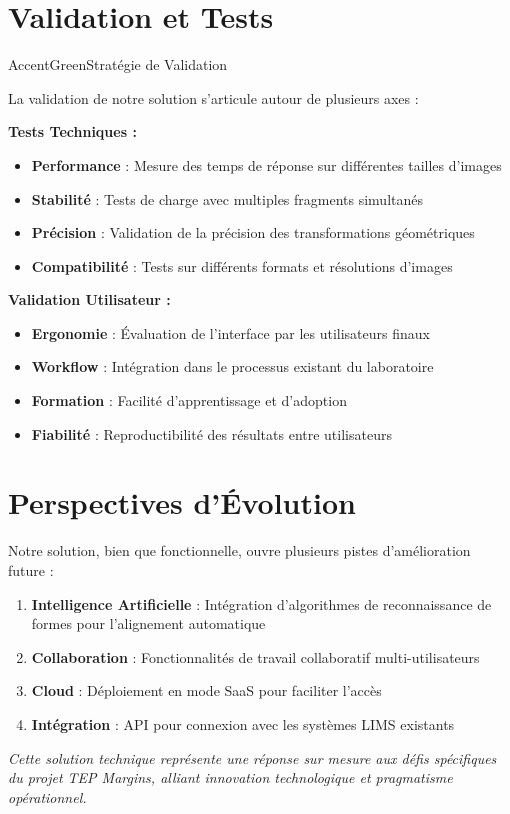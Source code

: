 \documentclass[11pt,a4paper]{article}
\begin{document}
\section{Validation et Tests}

\begin{subsectionbox}{AccentGreen}{Stratégie de Validation}

La validation de notre solution s'articule autour de plusieurs axes :

\textbf{Tests Techniques :}
\begin{itemize}[leftmargin=*]
    \item \textbf{Performance} : Mesure des temps de réponse sur différentes tailles d'images
    \item \textbf{Stabilité} : Tests de charge avec multiples fragments simultanés
    \item \textbf{Précision} : Validation de la précision des transformations géométriques
    \item \textbf{Compatibilité} : Tests sur différents formats et résolutions d'images
\end{itemize}

\textbf{Validation Utilisateur :}
\begin{itemize}[leftmargin=*]
    \item \textbf{Ergonomie} : Évaluation de l'interface par les utilisateurs finaux
    \item \textbf{Workflow} : Intégration dans le processus existant du laboratoire
    \item \textbf{Formation} : Facilité d'apprentissage et d'adoption
    \item \textbf{Fiabilité} : Reproductibilité des résultats entre utilisateurs
\end{itemize}

\end{subsectionbox}

\section{Perspectives d'Évolution}

Notre solution, bien que fonctionnelle, ouvre plusieurs pistes d'amélioration future :

\begin{enumerate}[leftmargin=*]
    \item \textbf{Intelligence Artificielle} : Intégration d'algorithmes de reconnaissance de formes pour l'alignement automatique
    \item \textbf{Collaboration} : Fonctionnalités de travail collaboratif multi-utilisateurs
    \item \textbf{Cloud} : Déploiement en mode SaaS pour faciliter l'accès
    \item \textbf{Intégration} : API pour connexion avec les systèmes LIMS existants
\end{enumerate}

\vspace{1cm}

\begin{center}
\textit{Cette solution technique représente une réponse sur mesure aux défis spécifiques\\du projet TEP Margins, alliant innovation technologique et pragmatisme opérationnel.}
\end{center}
\end{document}
